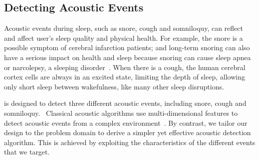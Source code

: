\subsection{ Detecting Acoustic Events \label{sec:acoustic}}
Acoustic events during sleep, such as snore, cough and somniloquy, can reflect and affect user's sleep quality and physical health. For
example, the snore is a possible symptom of cerebral infarction patients; and long-term snoring can also have a serious impact on health
and sleep because snoring can cause sleep apnea or narcolepsy, a sleeping disorder~\cite{snoring2016,snoring2013}. When there is a cough,
the human cerebral cortex cells are always in an excited state, limiting the depth of sleep, allowing only short sleep between wakefulness,
like many other sleep disruptions.


{\systemname} is designed to detect three different acoustic events, including snore, cough and somniloquy. \ Classical acoustic algorithms
use multi-dimensional features to detect acoustic events from a complex environment~\cite{gu2016sleep}. By contrast, we tailor our design
to the problem domain to derive a simpler yet effective acoustic detection algorithm. This is achieved by exploiting the characteristics of
the different events that we target.


